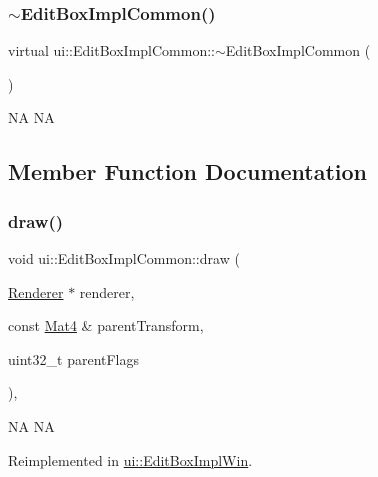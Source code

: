 \subsubsection{\texorpdfstring{$\sim$\+Edit\+Box\+Impl\+Common()}{~EditBoxImplCommon()}\hspace{0.1cm}{\footnotesize\ttfamily [2/2]}}
{\footnotesize\ttfamily virtual ui\+::\+Edit\+Box\+Impl\+Common\+::$\sim$\+Edit\+Box\+Impl\+Common (\begin{DoxyParamCaption}{ }\end{DoxyParamCaption})\hspace{0.3cm}{\ttfamily [virtual]}}

NA  NA 

\subsection{Member Function Documentation}
\mbox{\label{classui_1_1EditBoxImplCommon_a778a70b2785868a3b8e6953c95277573}} 
\subsubsection{\texorpdfstring{draw()}{draw()}\hspace{0.1cm}{\footnotesize\ttfamily [1/2]}}
{\footnotesize\ttfamily void ui\+::\+Edit\+Box\+Impl\+Common\+::draw (\begin{DoxyParamCaption}\item[{\hyperlink{classRenderer}{Renderer} $\ast$}]{renderer,  }\item[{const \hyperlink{classMat4}{Mat4} \&}]{parent\+Transform,  }\item[{uint32\+\_\+t}]{parent\+Flags }\end{DoxyParamCaption})\hspace{0.3cm}{\ttfamily [override]}, {\ttfamily [virtual]}}

NA  NA 

Reimplemented in \hyperlink{classui_1_1EditBoxImplWin_a8709f6415ecea16cd9a09eb3fddc2d6a}{ui\+::\+Edit\+Box\+Impl\+Win}.

\mbox{\label{classui_1_1EditBoxImplCommon_a7a0f13f9b474b83b43aa357a3fd123ca}} 
